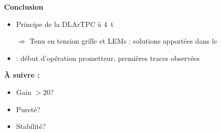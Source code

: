     {
        \begin{specialframe}
            \hspace*{-1.8cm}\parbox[t]{\textwidth}{
                        \centering \begin{Huge}
                        \vspace{2cm}
                        \textbf{Conclusion}
                        \vspace{1cm}
                        \end{Huge}
                        \begin{itemize}
                            \item Principe de la DLArTPC \textcolor{green}{\checkmark} à \SI{4}{\tonne}
                            \item[$\Rightarrow$] Tenu en tension grille et LEMs : solutions apportées dans le \SSS{}
                            \item \SSS{} : début d'opération prometteur, premières traces observées
                        \end{itemize}
                        \vspace{0.3cm}
                        \textbf{À suivre :}
                        \begin{itemize}
                            \item Gain $> 20$?
                            \item Pureté?
                            \item Stabilité?
                        \end{itemize}
                    }
        \end{specialframe}
    }
    

